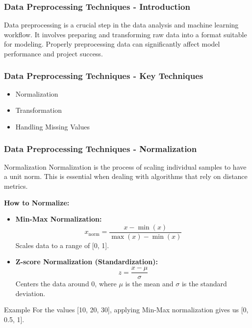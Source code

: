 \documentclass[aspectratio=169]{beamer}
\begin{document}
\begin{frame}[fragile]
    \frametitle{Data Preprocessing Techniques - Introduction}
    Data preprocessing is a crucial step in the data analysis and machine learning workflow. It involves preparing and transforming raw data into a format suitable for modeling. Properly preprocessing data can significantly affect model performance and project success.
\end{frame}

\begin{frame}[fragile]
    \frametitle{Data Preprocessing Techniques - Key Techniques}
    \begin{itemize}
        \item Normalization
        \item Transformation
        \item Handling Missing Values
    \end{itemize}
\end{frame}

\begin{frame}[fragile]
    \frametitle{Data Preprocessing Techniques - Normalization}
    \begin{block}{Normalization}
        Normalization is the process of scaling individual samples to have a unit norm. This is essential when dealing with algorithms that rely on distance metrics.
    \end{block}
    \textbf{How to Normalize:}
    \begin{itemize}
        \item \textbf{Min-Max Normalization:}
        \begin{equation}
        x_{\text{norm}} = \frac{x - \min(x)}{\max(x) - \min(x)}
        \end{equation}
        Scales data to a range of [0, 1].
        
        \item \textbf{Z-score Normalization (Standardization):}
        \begin{equation}
        z = \frac{x - \mu}{\sigma}
        \end{equation}
        Centers the data around 0, where $\mu$ is the mean and $\sigma$ is the standard deviation.
    \end{itemize}
    \begin{block}{Example}
        For the values [10, 20, 30], applying Min-Max normalization gives us [0, 0.5, 1].
    \end{block}
\end{frame}
\end{document}
